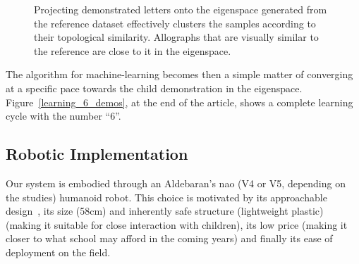 \documentclass{article}
\begin{document}
\begin{figure}[ht!]
    \centering

    \caption{\small Projecting demonstrated letters onto the eigenspace
    generated from the reference dataset effectively clusters the samples
    according to their topological similarity. Allographs that are visually similar to
    the reference are close to it in the eigenspace.}
    \label{fig:h}
\end{figure}

The algorithm for machine-learning becomes then a simple matter of converging at
a specific pace towards the child demonstration in the eigenspace.
Figure~\ref{learning_6_demos}, at the end of the article, shows a complete learning cycle
with the number ``6''.

\subsection{Robotic Implementation}

Our system is embodied through an Aldebaran's {\sc nao} (V4 or V5, depending on the studies)
humanoid robot. This choice is motivated by its approachable
design~\cite{Gouaillier2008}, its size (58cm) and inherently safe structure (lightweight
plastic) (making it suitable for close interaction with children), its low price
(making it closer to what school may afford in the coming years) and finally its
ease of deployment on the field.
\end{document}

